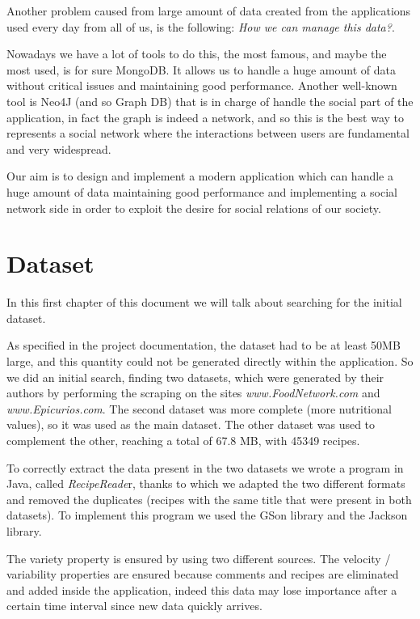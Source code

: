 \documentclass[a4paper]{report}
\begin{document}
\noindent Another problem caused from large amount of data created from the applications used every day from all of us, is the following: \emph{How we can manage this data?}.

\noindent Nowadays we have a lot of tools to do this, the most famous, and maybe the most used, is for sure MongoDB. It allows us to handle a huge amount of data without critical issues and maintaining good performance. Another well-known tool is Neo4J (and so Graph DB) that is in charge of handle the social part of the application, in fact the graph is indeed a network, and so this is the best way to represents a social network where the interactions between users are fundamental and very widespread.

\noindent Our aim is to design and implement a modern application which can handle a huge amount of data maintaining good performance and implementing a social network side in order to exploit the desire for social relations of our society.



\chapter{Dataset}
In this first chapter of this document we will talk about searching for the initial dataset.

\noindent As specified in the project documentation, the dataset had to be at least 50MB large, and this quantity could not be generated directly within the application. So we did an initial search, finding two datasets, which were generated by their authors by performing the scraping on the sites \emph{www.FoodNetwork.com} and \emph{www.Epicurios.com}. The second dataset was more complete (more nutritional values), so it was used as the main dataset. The other dataset was used to complement the other, reaching a total of  67.8 MB, with 45349 recipes.

\noindent To correctly extract the data present in the two datasets we wrote a program in Java, called \emph{RecipeReade}r, thanks to which we adapted the two different formats and removed the duplicates (recipes with the same title that were present in both datasets).
To implement this program we used the GSon library and the Jackson library.

\noindent The variety property is ensured by using two different sources. The velocity / variability properties are ensured because comments and recipes are eliminated and added inside the application, indeed this data may lose importance after a certain time interval since new data quickly arrives.
\end{document}

